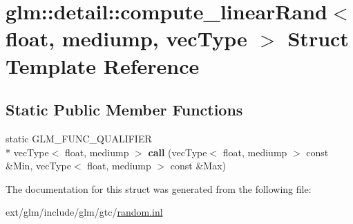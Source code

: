 \hypertarget{structglm_1_1detail_1_1compute__linear_rand_3_01float_00_01mediump_00_01vec_type_01_4}{\section{glm\-:\-:detail\-:\-:compute\-\_\-linear\-Rand$<$ float, mediump, vec\-Type $>$ Struct Template Reference}
\label{structglm_1_1detail_1_1compute__linear_rand_3_01float_00_01mediump_00_01vec_type_01_4}
}
\subsection*{Static Public Member Functions}
\begin{DoxyCompactItemize}
\item 
\hypertarget{structglm_1_1detail_1_1compute__linear_rand_3_01float_00_01mediump_00_01vec_type_01_4_a9202e17262bd8b1ffb9804bf681e1d49}{static G\-L\-M\-\_\-\-F\-U\-N\-C\-\_\-\-Q\-U\-A\-L\-I\-F\-I\-E\-R \\*
vec\-Type$<$ float, mediump $>$ {\bfseries call} (vec\-Type$<$ float, mediump $>$ const \&Min, vec\-Type$<$ float, mediump $>$ const \&Max)}\label{structglm_1_1detail_1_1compute__linear_rand_3_01float_00_01mediump_00_01vec_type_01_4_a9202e17262bd8b1ffb9804bf681e1d49}

\end{DoxyCompactItemize}


The documentation for this struct was generated from the following file\-:\begin{DoxyCompactItemize}
\item 
ext/glm/include/glm/gtc/\hyperlink{random_8inl}{random.\-inl}\end{DoxyCompactItemize}
